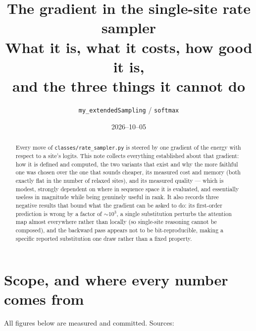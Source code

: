 \documentclass[11pt,a4paper]{article}
\title{The gradient in the single-site rate sampler\\
       \large What it is, what it costs, how good it is,\\
       and the three things it cannot do}
\author{\texttt{my\_extendedSampling} / \texttt{softmax}}
\date{2026--10--05}
\begin{document}
\maketitle

\begin{abstract}
\noindent
Every move of \texttt{classes/rate\_sampler.py} is steered by one gradient of
the energy with respect to a site's logits. This note collects everything
established about that gradient: how it is defined and computed, the two
variants that exist and why the more faithful one was chosen over the one that
sounds cheaper, its measured cost and memory (both exactly flat in the number
of relaxed sites), and its measured quality --- which is modest, strongly
dependent on where in sequence space it is evaluated, and essentially useless
in magnitude while being genuinely useful in rank. It also records three
negative results that bound what the gradient can be asked to do: its
first-order prediction is wrong by a factor of $\sim\!10^{3}$, a single
substitution perturbs the attention map almost everywhere rather than locally
(so single-site reasoning cannot be composed), and the backward pass appears
not to be bit-reproducible, making a specific reported substitution one draw
rather than a fixed property.
\end{abstract}

\tableofcontents

\section{Scope, and where every number comes from}

All figures below are measured and committed. Sources:
\end{document}
